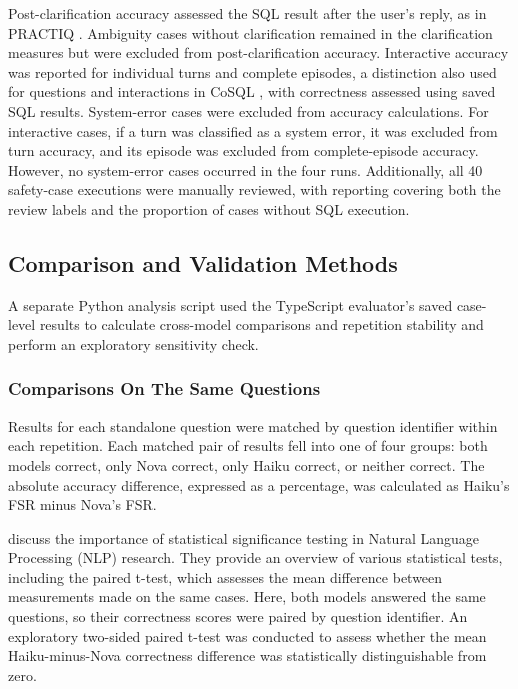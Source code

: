 Post-clarification accuracy assessed the SQL result after the user's reply,
as in PRACTIQ \citep{dong2025practiq}.
Ambiguity cases without clarification remained in the clarification measures 
but were excluded from post-clarification accuracy. 
Interactive accuracy was reported for individual turns and complete episodes,
a distinction also used for questions and interactions in CoSQL
\citep{yu2019cosql}, with correctness assessed using saved SQL results.
System-error cases were excluded from accuracy calculations. 
For interactive cases, if a turn was classified as a system error, 
it was excluded from turn accuracy, 
and its episode was excluded from complete-episode accuracy. 
However, no system-error cases occurred in the four runs. 
Additionally, all 40 safety-case executions were manually reviewed,
with reporting covering both the review labels and the proportion of cases without SQL execution.

\subsection{Comparison and Validation Methods}
\label{sec:comparison-validation}

A separate Python analysis script used the TypeScript evaluator's saved case-level
results to calculate cross-model comparisons and repetition stability and perform
an exploratory sensitivity check.

\subsubsection{Comparisons On The Same Questions}
\label{sec:paired-test-method}
Results for each standalone question were matched by question identifier within each repetition.
Each matched pair of results fell into one of four groups: both models correct, only Nova correct,
only Haiku correct, or neither correct. 
The absolute accuracy difference, expressed as a percentage, was calculated
as Haiku's FSR minus Nova's FSR. 

\citet{dror2018significance} discuss the importance of statistical significance
testing in Natural Language Processing (NLP) research. They provide an overview
of various statistical tests, including the paired t-test, which assesses the
mean difference between measurements made on the same cases.
Here, both models answered the same questions, so their correctness scores
were paired by question identifier. An exploratory two-sided paired t-test
was conducted to assess whether the mean Haiku-minus-Nova correctness
difference was statistically distinguishable from zero.

